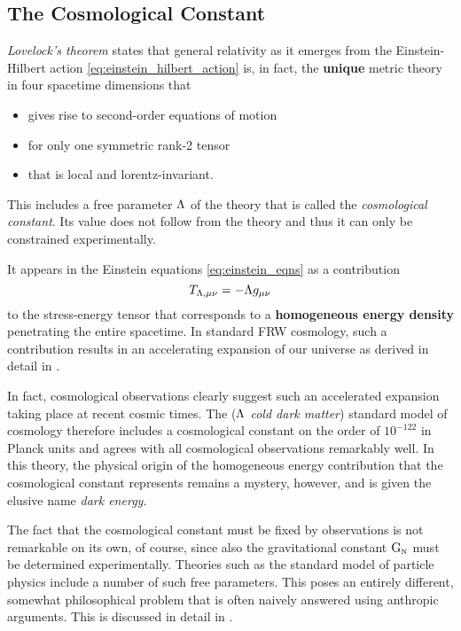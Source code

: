 \documentclass[12pt,parskip=half]{scrreprt}
\begin{document}
\subsection{The Cosmological Constant}\label{sec:cc_intro}

\emph{Lovelock's theorem}\label{sec:lovelock} states that general relativity as it emerges from the Einstein-Hilbert action \ref{eq:einstein_hilbert_action} is, in fact, the \textbf{unique} metric theory in four spacetime dimensions that 
\begin{itemize}
	\item gives rise to second-order equations of motion
	\item for only one symmetric rank-2 tensor
	\item that is local and lorentz-invariant.
\end{itemize}
This includes a free parameter \(\Lambda\) of the theory that is called the \emph{cosmological constant}. Its value does not follow from the theory and thus it can only be constrained experimentally.

It appears in the Einstein equations \ref{eq:einstein_eqns} as a contribution
\begin{equation}
	T_{\Lambda\textnormal{,}\mu\nu} = - \Lambda g_{\mu\nu}
\end{equation}
to the stress-energy tensor that corresponds to a \textbf{homogeneous energy density} penetrating the entire spacetime. In standard FRW cosmology, such a contribution results in an accelerating expansion of our universe as derived in detail in .

In fact, cosmological observations clearly suggest such an accelerated expansion taking place at recent cosmic times.  The \LCDM (\emph{\(\Lambda\) cold dark matter}) standard model of cosmology therefore includes a cosmological constant on the order of \(10^{-122}\) in Planck units and agrees with all  cosmological observations remarkably well. In this theory, the physical origin of the homogeneous energy contribution that the cosmological constant represents remains a mystery, however, and is given the elusive  name \emph{dark energy}. 

The fact that the cosmological constant must be fixed by observations is not remarkable on its own, of course, since also the gravitational constant \(\mathrm{G}_\textnormal{\tiny{N}}\) must be determined experimentally. Theories such as the standard model of particle physics include a number of such free parameters. This poses an entirely different, somewhat philosophical problem that is often naively answered using anthropic arguments. This is discussed in detail in .
\end{document}
